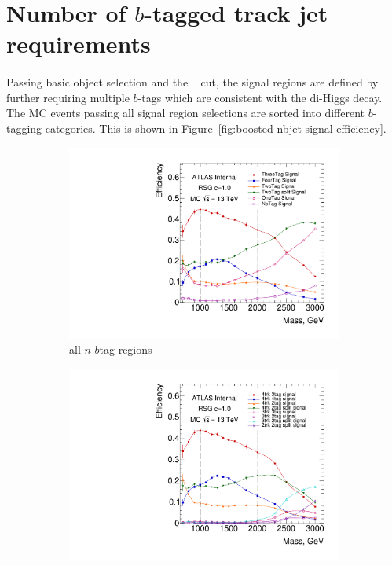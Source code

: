 \section{Number of $b$-tagged track jet requirements}
\paragraph{}
Passing basic object selection and the \Xhh~ cut, the signal regions are defined by further requiring multiple $b$-tags which are consistent with the di-Higgs decay.
The MC events passing all signal region selections are sorted into different $b$-tagging categories. 
This is shown in Figure~\ref{fig:boosted-nbjet-signal-efficiency}. 

\begin{figure}[htbp!]
    \captionsetup{justification=centering}
    \begin{subfigure}[b]{0.45\textwidth}
        \includegraphics[width=\textwidth,angle=-90]{figures/boosted/SigEff/region_lst_Moriond_Efficiency_AllTag_Signal.pdf}
        \caption{all $n$-$b$tag regions}
        \label{fig:boosted-nbjet-signal-efficiency-region}
    \end{subfigure}
    \quad
    \begin{subfigure}[b]{0.45\textwidth}
        \includegraphics[width=\textwidth,angle=-90]{figures/boosted/SigEff/detail_lst_Moriond_Efficiency_AllTag_Signal.pdf}

\end{subfigure}
\end{figure}
